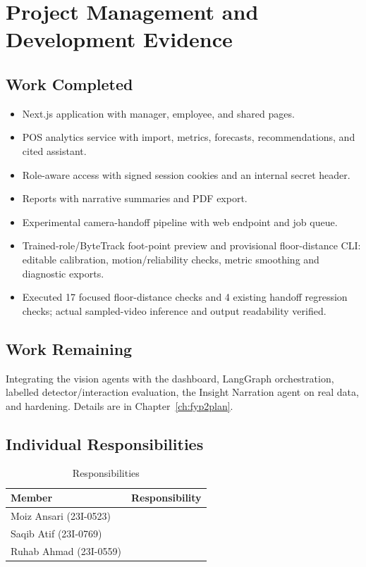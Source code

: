 \chapter{Project Management and Development Evidence}
\label{ch:mgmt}
\section{Work Completed}
\begin{itemize}
\item Next.js application with manager, employee, and shared pages.
\item POS analytics service with import, metrics, forecasts, recommendations, and cited assistant.
\item Role-aware access with signed session cookies and an internal secret header.
\item Reports with narrative summaries and PDF export.
\item Experimental camera-handoff pipeline with web endpoint and job queue.
\item Trained-role/ByteTrack foot-point preview and provisional floor-distance CLI: editable calibration, motion/reliability checks, metric smoothing and diagnostic exports.
\item Executed 17 focused floor-distance checks and 4 existing handoff regression checks; actual sampled-video inference and output readability verified.
\end{itemize}

\section{Work Remaining}
Integrating the vision agents with the dashboard, LangGraph orchestration, labelled detector/interaction evaluation, the Insight Narration agent on real data, and hardening. Details are in Chapter~\ref{ch:fyp2plan}.

\section{Individual Responsibilities}
\begin{table}[H]
\centering
\caption{Responsibilities}
\begin{tabular}{P{0.25\textwidth}P{0.62\textwidth}}
\toprule
Member & Responsibility\\
\midrule
Moiz Ansari (23I-0523) & \\
Saqib Atif (23I-0769) & \\
Ruhab Ahmad (23I-0559) & \\
\bottomrule
\end{tabular}
\end{table}

